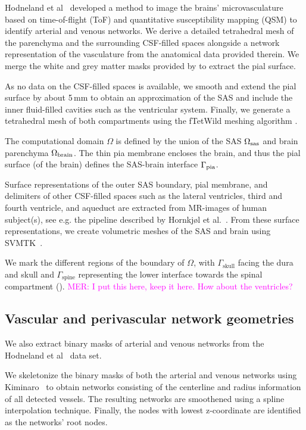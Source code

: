 \documentclass[fleqn,10pt]{wlscirep}
\newcommand{\mer}[1]{\textcolor{magenta}{#1}}
\begin{document}
Hodneland et al~\cite{hodneland2019new} developed a method to image
the brains' microvasculature based on time-of-flight (ToF) and
quantitative susceptibility mapping (QSM) to identify arterial and
venous networks.  We derive a detailed tetrahedral mesh of the
parenchyma and the surrounding CSF-filled spaces alongside a network
representation of the vasculature from the anatomical data provided
therein. We merge the white and grey matter masks provided by
\cite{hodneland2019new} to extract the pial surface.
 


As no data on the CSF-filled spaces is available, we smooth and extend
the pial surface by about 5\,mm to obtain an approximation of the SAS
and include the inner fluid-filled cavities such as the ventricular
system.  Finally, we generate a tetrahedral mesh of both compartments
using the fTetWild meshing algorithm \cite{hu2020fast}.

The computational domain $\Omega$ is defined by the union of the SAS $\Omega_{\rm sas}$ and brain parenchyma $\Omega_{\rm brain}$. The thin pia membrane encloses the brain, and thus the pial surface (of the brain) defines the SAS-brain interface $\Gamma_{\rm pia}$.


Surface representations of the outer SAS boundary, pial membrane, and delimiters of other CSF-filled spaces such as the lateral ventricles, third and fourth ventricle, and aqueduct are extracted from MR-images of human subject(s), see e.g. the pipeline described by Hornkjøl et al.~\cite{hornkjol2022csf}. From these surface representations, we create volumetric meshes of the SAS and brain using SVMTK~\cite{mardal2022mathematical}. 

We mark the different regions of the boundary of $\Omega$, with
$\Gamma_{\mathrm{skull}}$ facing the dura and skull and
$\Gamma_{\mathrm{spine}}$ representing the lower interface towards the
spinal compartment (). \mer{MER: I put this here, keep
  it here. How about the ventricles?}

\subsection*{Vascular and perivascular network geometries}

We also extract binary masks of arterial and venous networks from the Hodneland et al~\cite{hodneland2019new} data set. 

We skeletonize the binary masks of both the arterial and venous networks using Kiminaro~\cite{william_silversmith_2021_5539913} to obtain networks consisting of the centerline and radius information of all detected vessels. The resulting networks are smoothened using a spline interpolation technique. Finally, the nodes with lowest z-coordinate are identified as the networks' root nodes.
\end{document}
